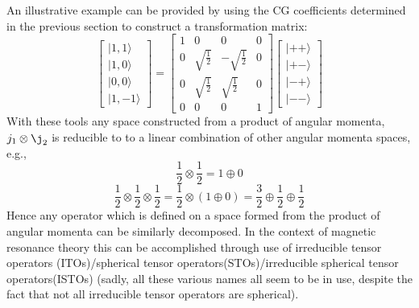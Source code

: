 \documentclass[12pt]{article}
\begin{document}
\noindent An illustrative example can be provided by using the CG coefficients
determined in the previous section to construct a transformation matrix:
\begin{equation}
\begin{bmatrix}
|1,1\rangle\\
|1,0\rangle\\
|0,0\rangle \\
|1,-1\rangle
\end{bmatrix}
=
\begin{bmatrix}
1 & 0                   & 0                  & 0 \\
0 & \sqrt{\frac{1}{2}}  &-\sqrt{\frac{1}{2}} & 0 \\
0 & \sqrt{\frac{1}{2}}  &\sqrt{\frac{1}{2}}  & 0 \\
0 & 0                   & 0                  & 1 
\end{bmatrix}
\begin{bmatrix}
|++\rangle \\
|+-\rangle\\
|-+\rangle\\
|--\rangle
\end{bmatrix}
\end{equation}
\noindent With these tools any space constructed from a product of
angular momenta, $j_{1}\otimes\j_{2}$ is reducible to to a linear combination of
other angular momenta spaces, e.g.,
\begin{equation*}
\frac{1}{2}\otimes\frac{1}{2} = 1 \oplus 0
\end{equation*}
\begin{equation}
\frac{1}{2}\otimes\frac{1}{2} \otimes \frac{1}{2}= \frac{1}{2}\otimes (1 \oplus 0)= \frac{3}{2} \oplus \frac{1}{2}\oplus\frac{1}{2}
\end{equation}
\noindent  Hence any operator which is defined on a space formed from the
product of angular momenta can be similarly decomposed. In the context of
magnetic resonance theory this can be accomplished through use of irreducible
tensor operators (ITOs)/spherical tensor operators(STOs)/irreducible spherical
tensor operators(ISTOs) (sadly, all these various names all seem to be in use,
despite the fact that not all irreducible tensor operators are spherical).\\
\end{document}
